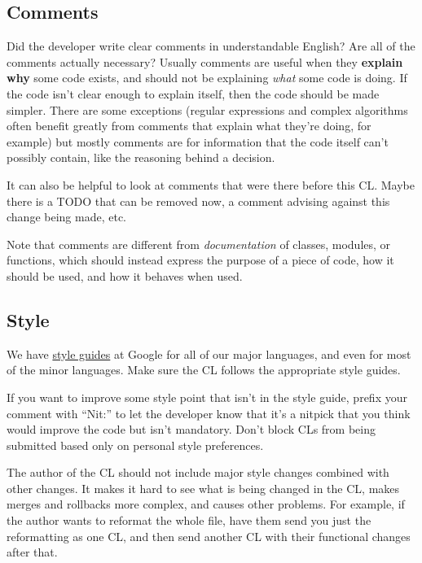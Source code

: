 \documentclass[
]{article}
\begin{document}
\subsection{Comments}\label{comments}

Did the developer write clear comments in understandable English? Are
all of the comments actually necessary? Usually comments are useful when
they \textbf{explain why} some code exists, and should not be explaining
\emph{what} some code is doing. If the code isn't clear enough to
explain itself, then the code should be made simpler. There are some
exceptions (regular expressions and complex algorithms often benefit
greatly from comments that explain what they're doing, for example) but
mostly comments are for information that the code itself can't possibly
contain, like the reasoning behind a decision.

It can also be helpful to look at comments that were there before this
CL. Maybe there is a TODO that can be removed now, a comment advising
against this change being made, etc.

Note that comments are different from \emph{documentation} of classes,
modules, or functions, which should instead express the purpose of a
piece of code, how it should be used, and how it behaves when used.

\subsection{Style}\label{style}

We have \href{http://google.github.io/styleguide/}{style guides} at
Google for all of our major languages, and even for most of the minor
languages. Make sure the CL follows the appropriate style guides.

If you want to improve some style point that isn't in the style guide,
prefix your comment with ``Nit:'' to let the developer know that it's a
nitpick that you think would improve the code but isn't mandatory. Don't
block CLs from being submitted based only on personal style preferences.

The author of the CL should not include major style changes combined
with other changes. It makes it hard to see what is being changed in the
CL, makes merges and rollbacks more complex, and causes other problems.
For example, if the author wants to reformat the whole file, have them
send you just the reformatting as one CL, and then send another CL with
their functional changes after that.
\end{document}

